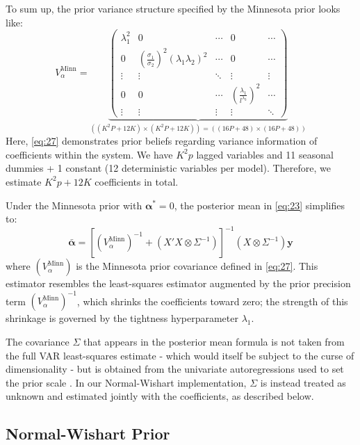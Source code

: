 \documentclass[12pt, a4paper]{article}
\begin{document}
To sum up, the prior variance structure specified by the Minnesota prior looks like:
\begin{equation} \label{eq:27}
V_{\alpha}^{\text{Minn}} = \underbrace{\begin{pmatrix}
\lambda_1^2 & 0 & \cdots & 0 & \cdots \\
0 & \left( \frac{\sigma_1}{\sigma_2} \right)^2 (\lambda_1 \lambda_2)^2 & \cdots & 0 & \cdots \\
\vdots & \vdots & \ddots & \vdots & \vdots \\
0 & 0 & \cdots & \left( \frac{\lambda_1}{l^{\lambda_3}} \right)^2 & \cdots \\
\vdots & \vdots & \vdots & \vdots & \ddots
\end{pmatrix}}_{((K^2P+12K) \times (K^2P+12K)) = ((16P+48) \times (16P+48)) }
\end{equation}
Here, \eqref{eq:27} demonstrates prior beliefs regarding variance information of coefficients within the system. We have $ K^2p$ lagged variables and 11 seasonal dummies + 1 constant (12 deterministic variables per model). Therefore, we estimate $ K^2p + 12K$ coefficients in total.

Under the Minnesota prior with $\boldsymbol{\alpha}^{*} = 0$, the posterior mean in \eqref{eq:23} simplifies to:
\begin{equation} \label{eq:28}
\bar{\boldsymbol{\alpha}} = \left[(V_\alpha^{\text{Minn}})^{-1} + (X'X \otimes \Sigma^{-1})\right]^{-1}(X \otimes \Sigma^{-1})\mathbf{y}
\end{equation}
where $(V_\alpha^{\text{Minn}})$ is the Minnesota prior covariance defined in \eqref{eq:27}. This estimator resembles the least-squares estimator augmented by the prior precision term $(V_\alpha^{\text{Minn}})^{-1}$, which shrinks the coefficients toward zero; the strength of this shrinkage is governed by the tightness hyperparameter $\lambda_1$.

The covariance $\Sigma$ that appears in the posterior mean formula is not taken from the full VAR least-squares estimate - which would itself be subject to the curse of dimensionality - but is obtained from the univariate autoregressions used to set the prior scale \citep{karlssonForecastingBayesianVector2012}. In our Normal-Wishart implementation, $\Sigma$ is instead treated as unknown and estimated jointly with the coefficients, as described below.

\subsection*{Normal-Wishart Prior}
\end{document}
